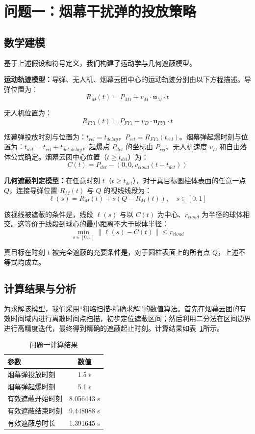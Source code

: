 \section{问题一：烟幕干扰弹的投放策略}

\subsection{数学建模}

基于上述假设和符号定义，我们构建了运动学与几何遮蔽模型。

\textbf{运动轨迹模型：}导弹、无人机、烟幕云团中心的运动轨迹分别由以下方程描述。导弹位置为：
\[
R_M(t) = P_{M1} + v_M \cdot \mathbf{u}_M \cdot t
\]

无人机位置为：
\[
R_{FY1}(t) = P_{FY1} + v_D \cdot \mathbf{u}_{FY1} \cdot t
\]

烟幕弹投放时刻与位置为：$t_{rel} = t_{delay}$，$P_{rel} = R_{FY1}(t_{rel})$。烟幕弹起爆时刻与位置为：$t_{det} = t_{rel} + t_{det\_delay}$，起爆点 $P_{det}$ 的坐标由 $P_{rel}$、无人机速度 $v_D$ 和自由落体公式确定。烟幕云团中心位置（$t \ge t_{det}$）为：
\[
C(t) = P_{det} - (0, 0, v_{cloud}(t - t_{det}))
\]

\textbf{几何遮蔽判定模型：}在任意时刻 $t$（$t \ge t_{det}$），对于真目标圆柱体表面的任意一点 $Q$，连接导弹位置 $R_M(t)$ 与 $Q$ 的视线线段为：
\[
\ell(s) = R_M(t) + s(Q - R_M(t)), \quad s \in [0, 1]
\]

该视线被遮蔽的条件是，线段 $\ell(s)$ 与以 $C(t)$ 为中心、$r_{cloud}$ 为半径的球体相交。这等价于线段到球心的最小距离不大于球体半径：
\[
\min_{s \in [0,1]} \|\ell(s) - C(t)\| \le r_{cloud}
\]

真目标在时刻 $t$ 被完全遮蔽的充要条件是，对于圆柱表面上的所有点 $Q$，上述不等式均成立。

\subsection{计算结果与分析}

为求解该模型，我们采用“粗略扫描-精确求解”的数值算法。首先在烟幕云团的有效时间域内进行离散时间点扫描，初步定位遮蔽区间；然后利用二分法在区间边界进行高精度迭代，最终得到精确的遮蔽起止时刻。计算结果如表~\ref{tab:q1_results}所示。

\begin{table}[htbp]
\centering
\caption{问题一计算结果}
\label{tab:q1_results}
\begin{tabular}{lc}
\toprule
\textbf{参数} & \textbf{数值} \\
\midrule
烟幕弹投放时刻 & 1.5 s \\
烟幕弹起爆时刻 & 5.1 s \\
有效遮蔽开始时刻 & 8.056443 s \\
有效遮蔽结束时刻 & 9.448088 s \\
有效遮蔽总时长 & 1.391645 s \\
\bottomrule
\end{tabular}
\end{table}

